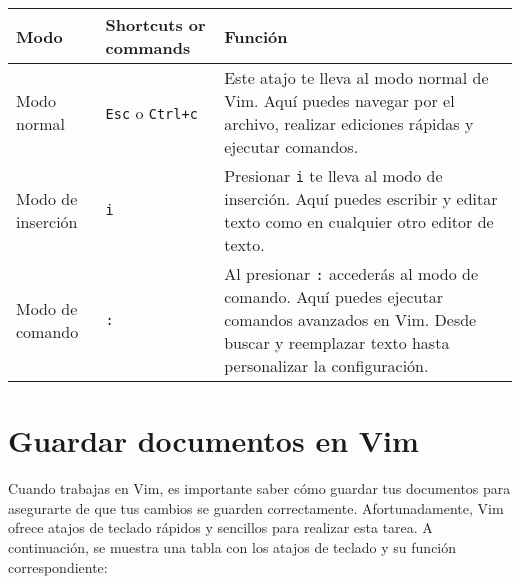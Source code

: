\documentclass[
  doc,
  floatsintext,
  longtable,
  a4paper,
  nolmodern,
  notxfonts,
  notimes,
  colorlinks=true,linkcolor=blue,citecolor=blue,urlcolor=blue]{apa7}
\begin{document}
\begin{longtable}[]{@{}
  >{\raggedright\arraybackslash}p{}
  >{\raggedright\arraybackslash}p{}
  >{\raggedright\arraybackslash}p{}@{}}
\toprule\noalign{}
\begin{minipage}[b]{\linewidth}\raggedright
Modo
\end{minipage} & \begin{minipage}[b]{\linewidth}\raggedright
Shortcuts or commands
\end{minipage} & \begin{minipage}[b]{\linewidth}\raggedright
Función
\end{minipage} \\
\midrule\noalign{}
\endhead
\bottomrule\noalign{}
\endlastfoot
Modo normal & \texttt{Esc} o \texttt{Ctrl+c} & Este atajo te lleva al
modo normal de Vim. Aquí puedes navegar por el archivo, realizar
ediciones rápidas y ejecutar comandos. \\
Modo de inserción & \texttt{i} & Presionar \texttt{i} te lleva al modo
de inserción. Aquí puedes escribir y editar texto como en cualquier otro
editor de texto. \\
Modo de comando & \texttt{:} & Al presionar \texttt{:} accederás al modo
de comando. Aquí puedes ejecutar comandos avanzados en Vim. Desde buscar
y reemplazar texto hasta personalizar la configuración. \\
\end{longtable}

\section{Guardar documentos en Vim}\label{guardar-documentos-en-vim}

Cuando trabajas en Vim, es importante saber cómo guardar tus documentos
para asegurarte de que tus cambios se guarden correctamente.
Afortunadamente, Vim ofrece atajos de teclado rápidos y sencillos para
realizar esta tarea. A continuación, se muestra una tabla con los atajos
de teclado y su función correspondiente:
\end{document}
